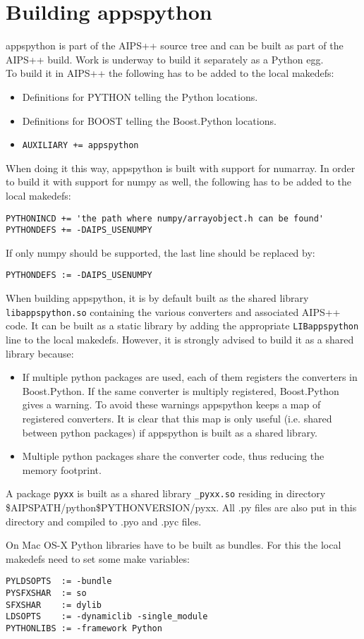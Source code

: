 \section{Building appspython}
appspython is part of the AIPS++ source tree and can be built as part of
the AIPS++ build. Work is underway to build it separately as a Python
egg.
\\To build it in AIPS++ the following has to be added to the local
makedefs:
\begin{itemize}
\item Definitions for PYTHON telling the Python locations.
\item Definitions for BOOST telling the Boost.Python locations.
\item \texttt{AUXILIARY += appspython}
\end{itemize}
When doing it this way, appspython is built with support for
numarray. In order to build it with support for numpy as well, the following
has to be added to the local makedefs:
\begin{verbatim}
PYTHONINCD += 'the path where numpy/arrayobject.h can be found'
PYTHONDEFS += -DAIPS_USENUMPY
\end{verbatim}
If only numpy should be supported, the last line should be replaced by:
\begin{verbatim}
PYTHONDEFS := -DAIPS_USENUMPY
\end{verbatim}
When building appspython, it is by default built as the shared library
\texttt{libappspython.so} 
containing the various converters and associated AIPS++ code. It can
be built as a static library by adding the appropriate
\texttt{LIBappspython} line to the local makedefs. However, it is
strongly advised to build it as a shared library because:
\begin{itemize}
\item If multiple python packages are used, each of them registers the
  converters in Boost.Python. If the same converter is multiply
  registered, Boost.Python gives a warning. To avoid these warnings
  appspython keeps a map of registered converters. It is clear that
  this map is only useful (i.e. shared between python packages)
  if appspython is built as a shared library.
\item Multiple python packages share the converter code, thus reducing the
  memory footprint.
\end{itemize}

A package \texttt{pyxx} is built as a shared library
\texttt{\_pyxx.so} residing in directory 
\$AIPSPATH/python\$PYTHONVERSION/pyxx. All .py files are also put in this
directory and compiled to .pyo and .pyc files.

On Mac OS-X Python libraries have to be built as bundles. For this the
local makedefs need to set some make variables:
\begin{verbatim}
PYLDSOPTS  := -bundle
PYSFXSHAR  := so
SFXSHAR    := dylib
LDSOPTS    := -dynamiclib -single_module
PYTHONLIBS := -framework Python
\end{verbatim}
